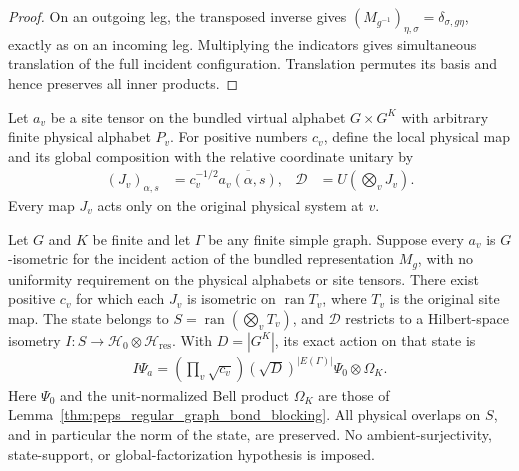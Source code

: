 \begin{proof}\leanok
    On an outgoing leg, the transposed inverse gives
    $(M_{g^{-1}})_{\eta,\sigma}=\delta_{\sigma,g\eta}$, exactly as on an
    incoming leg. Multiplying the indicators gives simultaneous translation
    of the full incident configuration. Translation permutes its basis and
    hence preserves all inner products.
\end{proof}

\begin{definition}%
    \label{def:peps_regular_graph_physical_disentangler}
    \leanok
    Let $a_v$ be a site tensor on the bundled virtual alphabet $G\times G^K$
    with arbitrary finite physical alphabet $P_v$. For positive numbers $c_v$,
    define the local physical map and its global composition with the relative
    coordinate unitary by
    \begin{align}
        (J_v)_{\alpha,s}
                   & =c_v^{-1/2}\overline{a_v(\alpha,s)}, &
        \mathcal D & =U\left(\bigotimes_vJ_v\right).
    \end{align}
    Every map $J_v$ acts only on the original physical system at $v$.
\end{definition}

\begin{lemma}%
    \label{thm:peps_regular_graph_physical_blocking}
    \leanok
    Let $G$ and $K$ be finite and let $\Gamma$ be any finite simple graph.
    Suppose every $a_v$ is $G$-isometric for the incident action of the bundled
    representation $M_g$, with no uniformity requirement on the physical
    alphabets or site tensors. There exist positive $c_v$ for which each
    $J_v$ is isometric on $\operatorname{ran}T_v$, where $T_v$ is the
    original site map. The state belongs to
    $S=\operatorname{ran}(\bigotimes_vT_v)$, and $\mathcal D$ restricts to a
    Hilbert-space isometry $I:S\to\mathcal H_0\otimes\mathcal H_{\mathrm{res}}$.
    With $D=|G^K|$, its exact action on that state is
    \begin{align}
        I\Psi_a
        =\left(\prod_v\sqrt{c_v}\right)(\sqrt D)^{|E(\Gamma)|}
        \Psi_0\otimes\Omega_K.
    \end{align}
    Here $\Psi_0$ and the unit-normalized Bell product $\Omega_K$ are those
    of Lemma~\ref{thm:peps_regular_graph_bond_blocking}. All physical
    overlaps on $S$, and in particular the norm of the state, are
    preserved. No ambient-surjectivity, state-support, or global-factorization
    hypothesis is imposed.
\end{lemma}


